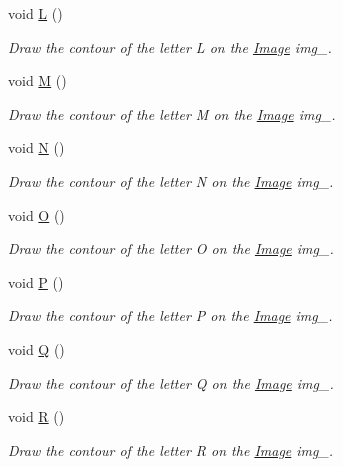 \begin{DoxyCompactItemize}
void \mbox{\hyperlink{class_font_v1_a17ba426bfb42af35ea882ab3beeba734}{L}} ()
\begin{DoxyCompactList}\small\item\em Draw the contour of the letter L on the \mbox{\hyperlink{class_image}{Image}} img\+\_\+. \end{DoxyCompactList}\item 
void \mbox{\hyperlink{class_font_v1_a69afdf545ed6bccbb31efaef5d6d4219}{M}} ()
\begin{DoxyCompactList}\small\item\em Draw the contour of the letter M on the \mbox{\hyperlink{class_image}{Image}} img\+\_\+. \end{DoxyCompactList}\item 
void \mbox{\hyperlink{class_font_v1_a725c93ea00d851ca5b43c0d594f1d6d0}{N}} ()
\begin{DoxyCompactList}\small\item\em Draw the contour of the letter N on the \mbox{\hyperlink{class_image}{Image}} img\+\_\+. \end{DoxyCompactList}\item 
void \mbox{\hyperlink{class_font_v1_a9338f8d780e9913a848310355973ebf3}{O}} ()
\begin{DoxyCompactList}\small\item\em Draw the contour of the letter O on the \mbox{\hyperlink{class_image}{Image}} img\+\_\+. \end{DoxyCompactList}\item 
void \mbox{\hyperlink{class_font_v1_aeaf56ebe48a78aedf53626f50f10ee4d}{P}} ()
\begin{DoxyCompactList}\small\item\em Draw the contour of the letter P on the \mbox{\hyperlink{class_image}{Image}} img\+\_\+. \end{DoxyCompactList}\item 
void \mbox{\hyperlink{class_font_v1_af7ffd76bf02756d0d1e2d3eab4c65c40}{Q}} ()
\begin{DoxyCompactList}\small\item\em Draw the contour of the letter Q on the \mbox{\hyperlink{class_image}{Image}} img\+\_\+. \end{DoxyCompactList}\item 
void \mbox{\hyperlink{class_font_v1_ab3f9a7e62f7d08792d9028da68f5787e}{R}} ()
\begin{DoxyCompactList}\small\item\em Draw the contour of the letter R on the \mbox{\hyperlink{class_image}{Image}} img\+\_\+. \end{DoxyCompactList}\item 

\end{DoxyCompactItemize}
